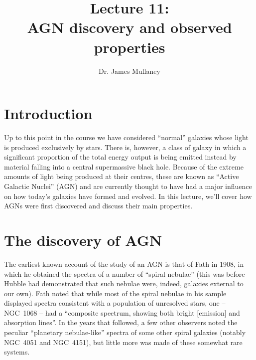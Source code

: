 \documentclass[11pt]{article}
\begin{document}
 
\title{Lecture 11:\\AGN discovery and observed properties}
\author{Dr. James Mullaney}
\maketitle

\section{Introduction}
Up to this point in the course we have considered ``normal'' galaxies
whose light is produced exclusively by stars. There is, however, a
class of galaxy in which a significant proportion of the total energy
output is being emitted instead by material falling into a central
supermassive black hole. Because of the extreme amounts of light being
produced at their centres, these are known as ``Active Galactic
Nuclei'' (AGN) and are currently thought to have had a major influence
on how today's galaxies have formed and evolved. In this lecture,
we'll cover how AGNs were first discovered and discuss their main
properties.

\section{The discovery of AGN}
The earliest known account of the study of an AGN is that of Fath in
1908, in which he obtained the spectra of a number of ``spiral
nebulae'' (this was before Hubble had demonstrated that such nebulae
were, indeed, galaxies external to our own). Fath noted that while
most of the spiral nebulae in his sample displayed spectra consistent
with a population of unresolved stars, one -- NGC~1068 -- had a
``composite spectrum, showing both bright $[$emission$]$ and
absorption lines''. In the years that followed, a few other observers
noted the peculiar ``planetary nebulae-like'' spectra of some other
spiral galaxies (notably NGC~4051 and NGC~4151), but little more was
made of these somewhat rare systems.
\end{document}
